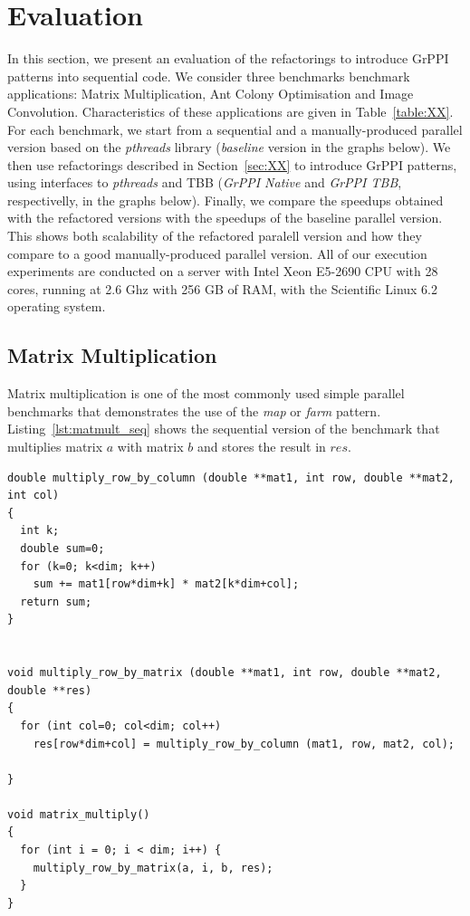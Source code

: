 \section{Evaluation}

\noindent
In this section, we present an evaluation of the refactorings to introduce GrPPI patterns into sequential code. We consider three benchmarks benchmark applications: Matrix Multiplication, Ant Colony Optimisation and Image Convolution. Characteristics of these applications are given in Table~\ref{table:XX}. For each benchmark, we start from a sequential and a manually-produced parallel version based on the \emph{pthreads} library (\emph{baseline} version in the graphs below). We then use refactorings described in Section~\ref{sec:XX} to introduce GrPPI patterns, using interfaces to \emph{pthreads} and TBB (\emph{GrPPI Native} and \emph{GrPPI TBB}, respectivelly, in the graphs below). Finally, we compare the speedups obtained with the refactored versions with the speedups of the baseline parallel version. This shows both scalability of the refactored paralell version and how they compare to a good manually-produced parallel version. All of our execution experiments are conducted on a server with Intel Xeon E5-2690 CPU with 28 cores, running at 2.6 Ghz with 256 GB of RAM, with the Scientific Linux 6.2 operating system.


\subsection{Matrix Multiplication}

\noindent Matrix multiplication is one of the most commonly used simple parallel benchmarks that demonstrates the use of the \emph{map} or \emph{farm} pattern. Listing~\ref{lst:matmult_seq} shows the sequential version of the benchmark that multiplies matrix $a$ with matrix $b$ and stores the result in $res$.

\begin{small}
  \begin{lstlisting}[caption=Sequential Matrix Multiplication\label{lst:matmult_seq}]
double multiply_row_by_column (double **mat1, int row, double **mat2, int col)
{
  int k;
  double sum=0;
  for (k=0; k<dim; k++)
    sum += mat1[row*dim+k] * mat2[k*dim+col];
  return sum;
}


void multiply_row_by_matrix (double **mat1, int row, double **mat2, double **res)
{
  for (int col=0; col<dim; col++)
    res[row*dim+col] = multiply_row_by_column (mat1, row, mat2, col);

}

void matrix_multiply()
{
  for (int i = 0; i < dim; i++) {
    multiply_row_by_matrix(a, i, b, res);
  }
}
  \end{lstlisting}
  
\end{small}


